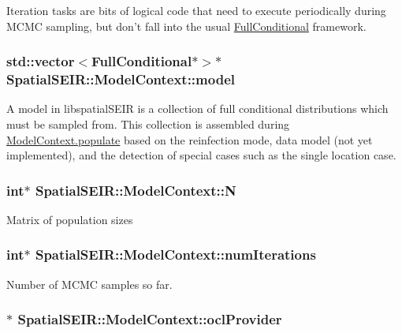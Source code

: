 Iteration tasks are bits of logical code that need to execute periodically during M\-C\-M\-C sampling, but don't fall into the usual \hyperlink{classSpatialSEIR_1_1FullConditional}{Full\-Conditional} framework. \hypertarget{classSpatialSEIR_1_1ModelContext_ad8f3a8fd85bef0ce628c0ea0a5debc8b}{
\subsubsection[{model}]{\setlength{\rightskip}{0pt plus 5cm}std\-::vector$<${\bf Full\-Conditional}$\ast$$>$$\ast$ Spatial\-S\-E\-I\-R\-::\-Model\-Context\-::model}}\label{classSpatialSEIR_1_1ModelContext_ad8f3a8fd85bef0ce628c0ea0a5debc8b}
A model in libspatial\-S\-E\-I\-R is a collection of full conditional distributions which must be sampled from. This collection is assembled during \hyperlink{classSpatialSEIR_1_1ModelContext_a4dc8841ea3e9b23dd8632a9f4998603d}{Model\-Context.\-populate} based on the reinfection mode, data model (not yet implemented), and the detection of special cases such as the single location case. \hypertarget{classSpatialSEIR_1_1ModelContext_a170b3ee4076d929c5e8012765f825eed}{
\subsubsection[{N}]{\setlength{\rightskip}{0pt plus 5cm}int$\ast$ Spatial\-S\-E\-I\-R\-::\-Model\-Context\-::\-N}}\label{classSpatialSEIR_1_1ModelContext_a170b3ee4076d929c5e8012765f825eed}
Matrix of population sizes \hypertarget{classSpatialSEIR_1_1ModelContext_aa8b6063ce0c31c485b42b2de28317ca4}{
\subsubsection[{num\-Iterations}]{\setlength{\rightskip}{0pt plus 5cm}int$\ast$ Spatial\-S\-E\-I\-R\-::\-Model\-Context\-::num\-Iterations}}\label{classSpatialSEIR_1_1ModelContext_aa8b6063ce0c31c485b42b2de28317ca4}
Number of M\-C\-M\-C samples so far. \hypertarget{classSpatialSEIR_1_1ModelContext_ab18c5fa9393c61d1936880776f534d62}{
\subsubsection[{ocl\-Provider}]{$\ast$ Spatial\-S\-E\-I\-R\-::\-Model\-Context\-::ocl\-Provider}}\label{classSpatialSEIR_1_1ModelContext_ab18c5fa9393c61d1936880776f534d62}
